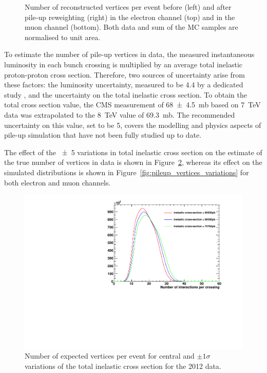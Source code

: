 \begin{figure}[!htpb]
    \caption[Number of reconstructed vertices per event before and after pile-up reweighting]{Number of reconstructed
    vertices per event before (left) and after pile-up reweighting (right) in the electron channel (top) and in the muon
    channel (bottom). Both data and sum of the MC samples are normalised to unit area.}
    \label{fig:pileup_vertices}
\end{figure}

To estimate the number of pile-up vertices in data, the measured instantaneous luminosity in each bunch crossing is
multiplied by an average total inelastic proton-proton cross section. Therefore, two sources of uncertainty arise from
these factors: the luminosity uncertainty, measured to be \SI{4.4}{\pc} by a dedicated study \autocite{CMS_lumi_2012},
and the uncertainty on the total inelastic cross section. To obtain the total cross section value, the CMS measurement
of \SI{68\pm4.5}{\milli\barn} based on \SI{7}{\TeV} data \autocite{CMS_total_inelastic_7TeV} was extrapolated to the
\SI{8}{\TeV} value of \SI{69.3}{\milli\barn}. The recommended uncertainty on this value, set to be \SI{5}{\pc}, covers
the modelling and physics aspects of pile-up simulation that have not been fully studied up to date.


The effect of the \SI{\pm5}{\pc} variations in total inelastic cross section on the estimate of the true number of
vertices in data is shown in Figure~\ref{fig:pileup_truth}, whereas its effect on the simulated distributions is shown
in Figure~\ref{fig:pileup_vertices_variations} for both electron and muon channels.

 \begin{figure}[htbp]
   	\centering
    \includegraphics[width=\textwidth]{vertices/PileUp_2012_truth_data.pdf}
    \caption[Number of expected vertices per event for central and $\pm1\sigma$ variations of the total inelastic cross
    section for the 2012 data]{Number of expected vertices per event for central and $\pm1\sigma$ variations of the
    total inelastic cross section for the 2012 data.}
    \label{fig:pileup_truth}
 \end{figure}

